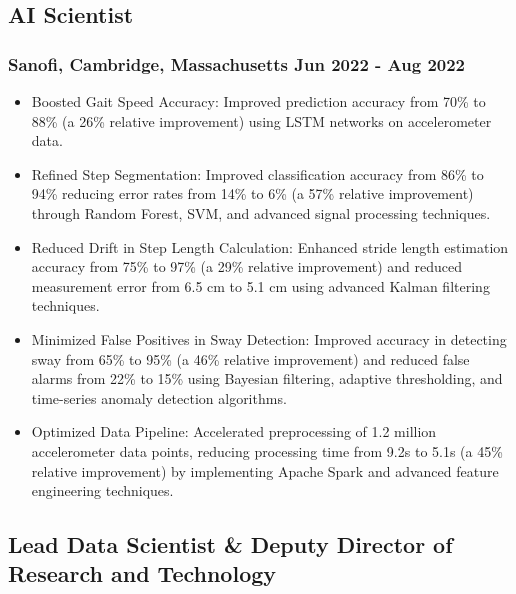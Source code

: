 \documentclass[11pt]{article} %
\begin{document}
\subsection{AI Scientist}
\subsubsection{Sanofi, Cambridge, Massachusetts \hfill Jun 2022 - Aug 2022}
\begin{itemize}[itemsep=5pt]
	\item Boosted Gait Speed Accuracy: Improved prediction accuracy from 70\% to 88\% (a 26\% relative improvement) using LSTM networks on accelerometer data.
	\item Refined Step Segmentation: Improved classification accuracy from 86\% to 94\% reducing error rates from 14\% to 6\% (a 57\% relative improvement) through Random Forest, SVM, and advanced signal processing techniques.
	\item Reduced Drift in Step Length Calculation: Enhanced stride length estimation accuracy from 75\% to 97\% (a 29\% relative improvement) and reduced measurement error from 6.5 cm to 5.1 cm using advanced Kalman filtering techniques.
	\item Minimized False Positives in Sway Detection: Improved accuracy in detecting sway from 65\% to 95\% (a 46\% relative improvement) and reduced false alarms from 22\% to 15\% using Bayesian filtering, adaptive thresholding, and time-series anomaly detection algorithms.
	\item Optimized Data Pipeline: Accelerated preprocessing of 1.2 million accelerometer data points, reducing processing time from 9.2s to 5.1s (a 45\% relative improvement) by implementing Apache Spark and advanced feature engineering techniques.
\end{itemize}

\subsection{Lead Data Scientist \& Deputy Director of Research and Technology}
\end{document}
